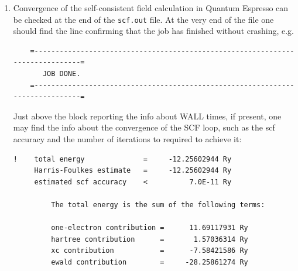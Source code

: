 \begin{enumerate}
	\item Convergence of the self-consistent field calculation in Quantum Espresso can be checked at the end of the {\tt scf.out} file. At the very end of the file one should find the line confirming that the job has finished without crashing, e.g.
  \begin{tcolorbox}[sharp corners,boxrule=0.5pt]
  {\small
	\begin{verbatim}
	=------------------------------------------------------------------------------=
	   JOB DONE.
	=------------------------------------------------------------------------------=
	\end{verbatim}
	}
  \end{tcolorbox}
  Just above the block reporting the info about WALL times, if present, one may find the info about the convergence of the SCF loop, such as the scf accuracy and the number of iterations to required to achieve it:  
\begin{tcolorbox}[sharp corners,boxrule=0.5pt]
{\small
	\begin{verbatim}
!    total energy              =     -12.25602944 Ry
     Harris-Foulkes estimate   =     -12.25602944 Ry
     estimated scf accuracy    <          7.0E-11 Ry

         The total energy is the sum of the following terms:

         one-electron contribution =      11.69117931 Ry
         hartree contribution      =       1.57036314 Ry
         xc contribution           =      -7.58421586 Ry
         ewald contribution        =     -28.25861274 Ry


\end{verbatim}}
\end{tcolorbox}
\end{enumerate}
